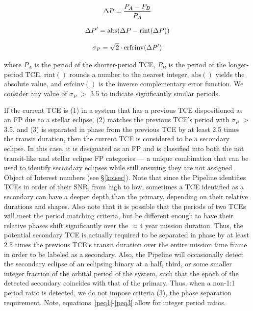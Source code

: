 \begin{equation}
\label{peq1}
\Delta P = \frac{P_{A}-P_{B}}{P_{A}}\\
\end{equation}

\begin{equation}
\label{peq2}
\Delta P^{\prime} = \textrm{abs}(\Delta P - \textrm{rint}(\Delta P))\\
\end{equation}

\begin{equation}
\label{peq3}
\sigma_{P} = \sqrt{2}\cdot\textrm{erfcinv}(\Delta P^{\prime})\\
\end{equation}

\noindent where $P_{A}$ is the period of the shorter-period TCE, $P_{B}$ is the period of the longer-period TCE, $\mathrm{rint()}$ rounds a number to the nearest integer, $\mathrm{abs()}$ yields the absolute value, and $\mathrm{erfcinv()}$ is the inverse complementary error function. We consider any value of $\sigma_{P}$ $>$ 3.5 to indicate significantly similar periods.

If the current TCE is (1) in a system that has a previous TCE dispositioned as an FP due to a stellar eclipse, (2) matches the previous TCE's period with $\sigma_{P}$ $>$ 3.5, and (3) is separated in phase from the previous TCE by at least 2.5 times the transit duration, then the current TCE is considered to be a secondary eclipse. In this case, it is designated as an FP and is classified into both the not transit-like and stellar eclipse FP categories --- a unique combination that can be used to identify secondary eclipses while still ensuring they are not assigned \kepler{} Object of Interest numbers (see \S\ref{koisec}). Note that since the \kepler{} Pipeline identifies TCEs in order of their SNR, from high to low, sometimes a TCE identified as a secondary can have a deeper depth than the primary, depending on their relative durations and shapes. Also note that it is possible that the periods of two TCEs will meet the period matching criteria, but be different enough to have their relative phases shift significantly over the $\approx$4 year mission duration. Thus, the potential secondary TCE is actually required to be separated in phase by at least 2.5 times the previous TCE's transit duration over the entire mission time frame in order to be labeled as a secondary. Also, the \kepler{} Pipeline will occasionally detect the secondary eclipse of an eclipsing binary at a half, third, or some smaller integer fraction of the orbital period of the system, such that the epoch of the detected secondary coincides with that of the primary. Thus, when a non-1:1 period ratio is detected, we do not impose criteria (3), the phase separation requirement. Note, equations~\ref{peq1}-\ref{peq3} allow for integer period ratios.



